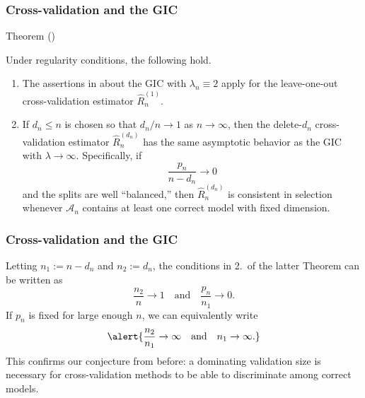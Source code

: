 \documentclass{beamer}
\newcommand{\0}{\emptyset}
\newcommand{\Acal}{\mathcal{A}_{n}}
\newcommand{\1}{\mathmybb{1}}
\begin{document}
\begin{frame}
    \frametitle{Cross-validation and the GIC}
    \begin{alertblock}{Theorem (\cite{shao_1997})}
        
        Under regularity conditions, the following hold.
        
        \begin{enumerate}
        \item The assertions in about the GIC with \(\lambda_{n}\equiv 2\) apply for the leave-one-out cross-validation estimator \(\hat{R}_{n}^{(1)}\).
        \item If \(d_{n}\leq n\) is chosen so that \(d_{n}/n\to1\) as \(n\to\infty\), then the delete-\(d_{n}\) cross-validation estimator \(\hat{R}_{n}^{(d_{n})}\) has the same asymptotic behavior as the GIC with \(\lambda\to\infty\). Specifically, if \[\frac{p_{n}}{n-d_{n}}\to 0\] and the splits are well ``balanced,'' then \(\hat{R}_{n}^{(d_{n})}\) is consistent in selection whenever \(\Acal\) contains at least one correct model with fixed dimension.
        \end{enumerate}
    \end{alertblock}
    
\end{frame}

\begin{frame}
  \frametitle{Cross-validation and the GIC}
  Letting \(n_{1}:=n-d_{n}\)  and \(n_{2}:=d_{n}\), the conditions in 2.\ of the latter Theorem can be written as 
\[\frac{n_{2}}{n}\to 1\quad\text{and}\quad \frac{p_{n}}{n_{1}}\to 0.\]
If \(p_{n}\) is fixed for large enough \(n\), we can equivalently write
\begin{equation}\label{eq:lmsplitcond}
    \alert{\frac{n_{2}}{n_{1}}\to\infty\quad\text{and}\quad n_{1}\to \infty.}
\end{equation}
This confirms our conjecture from before: a dominating validation size is necessary for cross-validation methods to be able to discriminate among correct models.
\end{frame}
\end{document}
